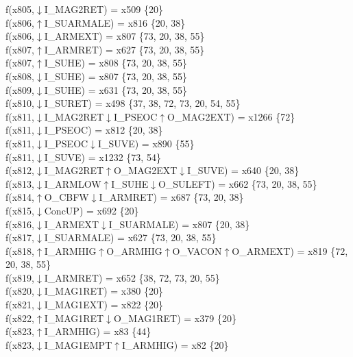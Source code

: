f(x805,$\downarrow$I\_MAG2RET) = x509 \{20\} \\  
f(x806,$\uparrow$I\_SUARMALE) = x816 \{20, 38\} \\  
f(x806,$\downarrow$I\_ARMEXT) = x807 \{73, 20, 38, 55\} \\  
f(x807,$\uparrow$I\_ARMRET) = x627 \{73, 20, 38, 55\} \\  
f(x807,$\uparrow$I\_SUHE) = x808 \{73, 20, 38, 55\} \\  
f(x808,$\downarrow$I\_SUHE) = x807 \{73, 20, 38, 55\} \\  
f(x809,$\downarrow$I\_SUHE) = x631 \{73, 20, 38, 55\} \\  
f(x810,$\downarrow$I\_SURET) = x498 \{37, 38, 72, 73, 20, 54, 55\} \\  
f(x811,$\downarrow$I\_MAG2RET$\downarrow$I\_PSEOC$\uparrow$O\_MAG2EXT) = x1266 \{72\} \\  
f(x811,$\downarrow$I\_PSEOC) = x812 \{20, 38\} \\  
f(x811,$\downarrow$I\_PSEOC$\downarrow$I\_SUVE) = x890 \{55\} \\  
f(x811,$\downarrow$I\_SUVE) = x1232 \{73, 54\} \\  
f(x812,$\downarrow$I\_MAG2RET$\uparrow$O\_MAG2EXT$\downarrow$I\_SUVE) = x640 \{20, 38\} \\  
f(x813,$\downarrow$I\_ARMLOW$\uparrow$I\_SUHE$\downarrow$O\_SULEFT) = x662 \{73, 20, 38, 55\} \\  
f(x814,$\uparrow$O\_CBFW$\downarrow$I\_ARMRET) = x687 \{73, 20, 38\} \\  
f(x815,$\downarrow$ConcUP) = x692 \{20\} \\  
f(x816,$\downarrow$I\_ARMEXT$\downarrow$I\_SUARMALE) = x807 \{20, 38\} \\  
f(x817,$\downarrow$I\_SUARMALE) = x627 \{73, 20, 38, 55\} \\  
f(x818,$\uparrow$I\_ARMHIG$\uparrow$O\_ARMHIG$\uparrow$O\_VACON$\uparrow$O\_ARMEXT) = x819 \{72, 20, 38, 55\} \\  
f(x819,$\downarrow$I\_ARMRET) = x652 \{38, 72, 73, 20, 55\} \\  
f(x820,$\downarrow$I\_MAG1RET) = x380 \{20\} \\  
f(x821,$\downarrow$I\_MAG1EXT) = x822 \{20\} \\  
f(x822,$\uparrow$I\_MAG1RET$\downarrow$O\_MAG1RET) = x379 \{20\} \\  
f(x823,$\uparrow$I\_ARMHIG) = x83 \{44\} \\  
f(x823,$\downarrow$I\_MAG1EMPT$\uparrow$I\_ARMHIG) = x82 \{20\} \\  
